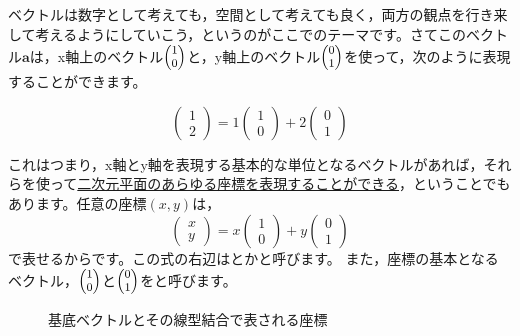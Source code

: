 \documentclass{ltjsbook}
\begin{document}
ベクトルは数字として考えても，空間として考えても良く，両方の観点を行き来して考えるようにしていこう，というのがここでのテーマです。さてこのベクトル$\bm{a}$は，x軸上のベクトル$\footnotesize\begin{pmatrix}1\\0\end{pmatrix}$と，y軸上のベクトル$\footnotesize\begin{pmatrix}0 \\ 1\end{pmatrix}$を使って，次のように表現することができます。

\[ \begin{pmatrix}1 \\2 \end{pmatrix} = 1\begin{pmatrix} 1 \\ 0 \end{pmatrix} + 2\begin{pmatrix} 0 \\1 \end{pmatrix} \]

これはつまり，x軸とy軸を表現する基本的な単位となるベクトルがあれば，それらを使って\underline{二次元平面のあらゆる座標を表現することができる}，ということでもあります。任意の座標$(x,y)$は，
\[ \begin{pmatrix}x \\y \end{pmatrix} = x\begin{pmatrix} 1 \\ 0 \end{pmatrix} + y\begin{pmatrix} 0 \\1 \end{pmatrix} \]
で表せるからです。この式の右辺はとかと呼びます。
また，座標の基本となるベクトル，$\footnotesize\begin{pmatrix}1\\0\end{pmatrix}$と$\footnotesize\begin{pmatrix}0 \\ 1\end{pmatrix}$をと呼びます。
\begin{figure}
	\centering
	\caption{基底ベクトルとその線型結合で表される座標}
	\label{orthonormalBasis}
\end{figure}
\end{document}
